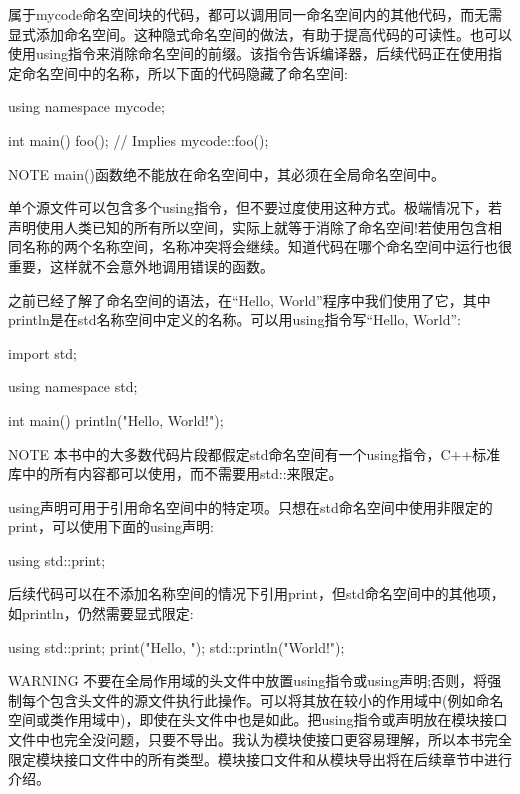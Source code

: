 属于mycode命名空间块的代码，都可以调用同一命名空间内的其他代码，而无需显式添加命名空间。这种隐式命名空间的做法，有助于提高代码的可读性。也可以使用using指令来消除命名空间的前缀。该指令告诉编译器，后续代码正在使用指定命名空间中的名称，所以下面的代码隐藏了命名空间:

\begin{cpp}
using namespace mycode;

int main()
{
    foo(); // Implies mycode::foo();
}
\end{cpp}

\begin{myNotic}{NOTE}
main()函数绝不能放在命名空间中，其必须在全局命名空间中。
\end{myNotic}

单个源文件可以包含多个using指令，但不要过度使用这种方式。极端情况下，若声明使用人类已知的所有所以空间，实际上就等于消除了命名空间!若使用包含相同名称的两个名称空间，名称冲突将会继续。知道代码在哪个命名空间中运行也很重要，这样就不会意外地调用错误的函数。

之前已经了解了命名空间的语法，在“Hello, World”程序中我们使用了它，其中println是在std名称空间中定义的名称。可以用using指令写“Hello, World”:

\begin{cpp}
import std;

using namespace std;

int main()
{
    println("Hello, World!");
}
\end{cpp}

\begin{myNotic}{NOTE}
本书中的大多数代码片段都假定std命名空间有一个using指令，C++标准库中的所有内容都可以使用，而不需要用std::来限定。
\end{myNotic}

using声明可用于引用命名空间中的特定项。只想在std命名空间中使用非限定的print，可以使用下面的using声明:

\begin{cpp}
using std::print;
\end{cpp}

后续代码可以在不添加名称空间的情况下引用print，但std命名空间中的其他项，如println，仍然需要显式限定:

\begin{cpp}
using std::print;
print("Hello, ");
std::println("World!");
\end{cpp}

\begin{myWarning}{WARNING}
不要在全局作用域的头文件中放置using指令或using声明;否则，将强制每个包含头文件的源文件执行此操作。可以将其放在较小的作用域中(例如命名空间或类作用域中)，即使在头文件中也是如此。把using指令或声明放在模块接口文件中也完全没问题，只要不导出。我认为模块使接口更容易理解，所以本书完全限定模块接口文件中的所有类型。模块接口文件和从模块导出将在后续章节中进行介绍。
\end{myWarning}


